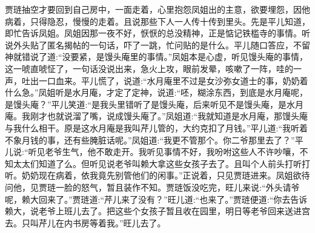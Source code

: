 \begin{parag}
    贾琏抽空才要回到自己房中，一面走着，心里抱怨凤姐出的主意，欲要埋怨，因他病着，只得隐忍，慢慢的走着。且说那些下人一人传十传到里头。先是平儿知道，即忙告诉凤姐。凤姐因那一夜不好，恹恹的总没精神，正是惦记铁槛寺的事情。听说外头贴了匿名揭帖的一句话，吓了一跳，忙问贴的是什么。平儿随口答应，不留神就错说了道:“没要紧，是馒头庵里的事情。”凤姐本是心虚，听见馒头庵的事情，这一唬直唬怔了，一句话没说出来，急火上攻，眼前发晕，咳嗽了一阵，哇的一声，吐出一口血来。平儿慌了，说道:“水月庵里不过是女沙弥女道士的事，奶奶着什么急。”凤姐听是水月庵，才定了定神，说道:“呸，糊涂东西，到底是水月庵呢，是馒头庵？”平儿笑道:“是我头里错听了是馒头庵，后来听见不是馒头庵，是水月庵。我刚才也就说溜了嘴，说成馒头庵了。”凤姐道:“我就知道是水月庵，那馒头庵与我什么相干。原是这水月庵是我叫芹儿管的，大约克扣了月钱。”平儿道:“我听着不象月钱的事，还有些腌脏话呢。”凤姐道:“我更不管那个。你二爷那里去了？”平儿说:“听见老爷生气，他不敢走开。我听见事情不好，我吩咐这些人不许吵嚷，不知太太们知道了么。但听见说老爷叫赖大拿这些女孩子去了。且叫个人前头打听打听。奶奶现在病着，依我竟先别管他们的闲事。”正说着，只见贾琏进来。凤姐欲待问他，见贾琏一脸的怒气，暂且装作不知。贾琏饭没吃完，旺儿来说:“外头请爷呢，赖大回来了。”贾琏道:“芹儿来了没有？”旺儿道:“也来了。”贾琏便道:“你去告诉赖大，说老爷上班儿去了。把这些个女孩子暂且收在园里，明日等老爷回来送进宫去。只叫芹儿在内书房等着我。”旺儿去了。
\end{parag}


